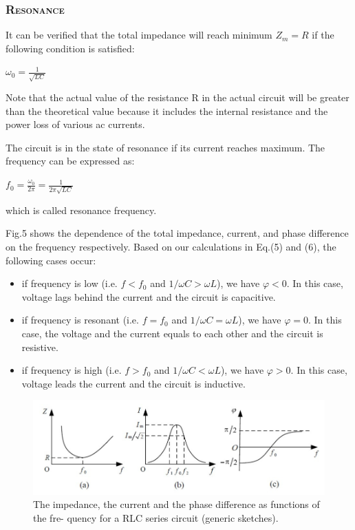 \documentclass[a4paper,12pt]{article}
\begin{document}
\subsubsection{\textsc{Resonance}}
It can be verified that the total impedance will reach minimum $Z_m = R$ if the following condition is satisfied:
\begin{center}
$\displaystyle \omega_0 = \frac{1}{\sqrt{LC}}$
\end{center}
Note that the actual value of the resistance R in the actual circuit will be greater than the theoretical value because it includes the internal resistance and the power loss of various ac currents.
\par The circuit is in the state of resonance if its current reaches maximum. The frequency can be expressed as:
\begin{center}
$\displaystyle f_{0}=\frac{\omega_{0}}{2 \pi}=\frac{1}{2 \pi \sqrt{L C}}$
\end{center}
which is called resonance frequency.
\par Fig.5 shows the dependence of the total impedance, current, and phase difference on the frequency respectively. Based on our calculations in Eq.(5) and (6), the following cases occur:
\begin{itemize}
\item if frequency is low (i.e. $f<f_0$ and $1/\omega C > \omega L$), we have $\varphi < 0$. In this case, voltage lags behind the current and the circuit is capacitive.
\item if frequency is resonant (i.e. $f=f_0$ and $1/\omega C = \omega L$), we have $\varphi = 0$. In this case, the voltage and the current equals to each other and the circuit is resistive.
\item if frequency is high (i.e. $f>f_0$ and $1/\omega C < \omega L$), we have $\varphi > 0$. In this case, voltage leads the current and the circuit is inductive.
\end{itemize}

\begin{figure}[htb] 
    \centering
    \includegraphics[width=1\textwidth]{Fig5} 
    \caption{The impedance, the current and the phase difference as functions of the fre- quency for a RLC series circuit (generic sketches). \cite{labmanual}} 
\end{figure}
\end{document}
